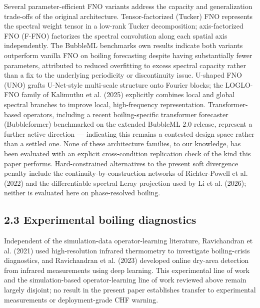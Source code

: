 \documentclass[preprint,12pt]{elsarticle}
\begin{document}
Several parameter-efficient FNO variants address the capacity and
generalization trade-offs of the original architecture.
Tensor-factorized (Tucker) FNO represents the spectral weight tensor in
a low-rank Tucker decomposition; axis-factorized FNO (F-FNO)\cite{tran2023ffno} factorizes
the spectral convolution along each spatial axis independently. The
BubbleML benchmark\textquotesingle s own results indicate both variants
outperform vanilla FNO on boiling forecasting despite having
substantially fewer parameters, attributed to reduced overfitting to
excess spectral capacity rather than a fix to the underlying periodicity
or discontinuity issue. U-shaped FNO (UNO)\cite{rahman2022uno} grafts U-Net-style
multi-scale structure onto Fourier blocks; the LOGLO-FNO family of
Kalimuthu et al. (2025)\cite{kalimuthu2025loglo} explicitly combines local and global spectral
branches to improve local, high-frequency representation.
Transformer-based operators, including a recent boiling-specific
transformer forecaster (Bubbleformer\cite{hassan2025bubbleformer}) benchmarked on the extended
BubbleML 2.0 release, represent a further active direction ---
indicating this remains a contested design space rather than a settled
one. None of these architecture families, to our knowledge, has been
evaluated with an explicit cross-condition replication check of the kind
this paper performs. Hard-constrained alternatives to the present soft
divergence penalty include the continuity-by-construction networks of
Richter-Powell et al. (2022)\cite{richterpowell2022neural} and the differentiable spectral Leray
projection used by Li et al. (2026)\cite{li2026project}; neither is evaluated here on
phase-resolved boiling.

\subsection*{2.3 Experimental boiling
diagnostics}\label{23-experimental-boiling-diagnostics}

Independent of the simulation-data operator-learning literature,
Ravichandran et al. (2021)\cite{ravichandran2021decrypting} used high-resolution infrared thermometry to
investigate boiling-crisis diagnostics, and Ravichandran et al. (2023)\cite{ravichandran2023dryareas}
developed online dry-area detection from infrared measurements using
deep learning. This experimental line of work and the simulation-based
operator-learning line of work reviewed above remain largely disjoint;
no result in the present paper establishes transfer to experimental
measurements or deployment-grade CHF warning.
\end{document}
